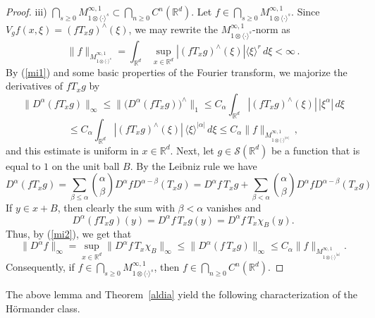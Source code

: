 \documentclass[12pt]{amsart}
\theoremstyle{definition}
\theoremstyle{remark}
\numberwithin{equation}{section}
\def\bR{{\mathbb{R}}}
\def\rd{\bR^d}
\newcommand{\Cal}{\mathcal}
\newcommand{\lan}{\langle}
\newcommand{\ran}{\rangle}
\begin{document}
\begin{proof}
iii) $
\bigcap_{s\ge0}M^{\infty,1}_{1\otimes\lan\cdot\ran^s}\subset
\bigcap _{n\geq 0} C^n(\rd )$. Let $f\in
\bigcap_{s\ge0}M^{\infty,1}_{1\otimes\lan\cdot\ran^s}$. Since
$V_gf(x,\xi)=(fT_xg)^\wedge (\xi)$, we may rewrite the
$M^{\infty,1}_{1\otimes\lan\cdot\ran^s}$-norm as
\begin{equation}\label{mi1}
\|f\|_{M^{\infty,1}_{1\otimes\lan\cdot\ran^s}}=\int_{\rd}\,\sup_{x\in\rd}|(fT_xg)^\wedge
(\xi)|{\lan \xi\ran^r}\,d\xi <\infty  \, .
\end{equation}
By (\ref{mi1}) and
some basic properties of the Fourier transform,  we majorize the
derivatives of $fT_xg$ by
\begin{equation}\label{mi2}
\|D^\alpha(fT_xg)\|_\infty\le
\|\big(D^\alpha(fT_xg)\big)^\wedge\|_1\le
C_\alpha\int_{\rd}|(fT_xg)^\wedge(\xi)|\,|\xi^\alpha|\,d\xi
\end{equation}
\[
\le
C_\alpha\int_{\rd}|(fT_xg)^\wedge(\xi)|\,\lan\xi\ran^{|\alpha|}\,d\xi
\le
C_\alpha\|f\|_{M^{\infty,1}_{1\otimes\lan\cdot\ran^{|\alpha|}}}\,
,
\]
and this  estimate is uniform in $x\in\rd$. %
Next, let $g\in\Cal S(\rd)$ be a function that is equal to $1$ on
the unit ball $B$. By the Leibniz rule we have
\[
D^\alpha(fT_xg)=\sum_{\beta\le \alpha}{\alpha\choose
\beta}D^\alpha f D^{\alpha-\beta}(T_xg)=D^\alpha f \, 
T_xg+\sum_{\beta< \alpha}{\alpha\choose \beta}D^\alpha f
D^{\alpha-\beta}(T_xg)
\]
If $y\in x+B$, then clearly  the sum with $\beta<\alpha$ vanishes
and
\[
D^\alpha (fT_xg)(y)=D^\alpha f\, T_xg(y)=D^\alpha f\, T_x\chi_B(y).
\]
Thus, by (\ref{mi2}), we get that
\[
\| D^\alpha f \|_\infty = \sup _{x\in \rd } \|D^\alpha
f\, T_x\chi_B\|_\infty \le\|D^\alpha(f\, T_xg)\|_\infty\le
C_\alpha\|f\|_{M^{\infty,1}_{1\otimes\lan\cdot\ran^{|\alpha|}}}.
\]
Consequently, if $f\in
\bigcap_{s\ge0}M^{\infty,1}_{1\otimes\lan\cdot\ran^s}$, then $f\in
\bigcap _{n\geq 0} C^n(\rd )$.
\end{proof}

The above lemma and Theorem~\ref{aldia} yield the following
characterization of the H\"ormander class.
\end{document}
